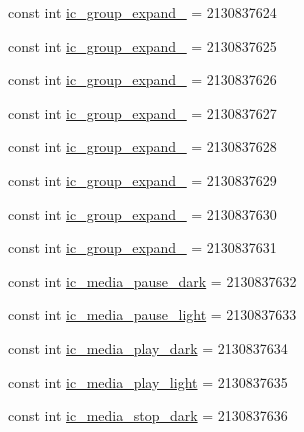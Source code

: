 \begin{DoxyCompactItemize}
const int \mbox{\hyperlink{class_f_w_p_s___app_1_1_droid_1_1_resource_1_1_drawable_aeb0da4a6f39fe37ebdde50a8a6639662}{ic\+\_\+group\+\_\+expand\+\_}} = 2130837624
\item 
const int \mbox{\hyperlink{class_f_w_p_s___app_1_1_droid_1_1_resource_1_1_drawable_a6e53be9af8507125e51d34368090e857}{ic\+\_\+group\+\_\+expand\+\_}} = 2130837625
\item 
const int \mbox{\hyperlink{class_f_w_p_s___app_1_1_droid_1_1_resource_1_1_drawable_a23ce362f15181282a19754dd45e2d028}{ic\+\_\+group\+\_\+expand\+\_}} = 2130837626
\item 
const int \mbox{\hyperlink{class_f_w_p_s___app_1_1_droid_1_1_resource_1_1_drawable_a7671283779e44c6d1b2dbe0d07ea8511}{ic\+\_\+group\+\_\+expand\+\_}} = 2130837627
\item 
const int \mbox{\hyperlink{class_f_w_p_s___app_1_1_droid_1_1_resource_1_1_drawable_a6d97ae100a12e085dc0cb138964bb2c7}{ic\+\_\+group\+\_\+expand\+\_}} = 2130837628
\item 
const int \mbox{\hyperlink{class_f_w_p_s___app_1_1_droid_1_1_resource_1_1_drawable_aab22b26f0e4a20274fdbf6c811189e40}{ic\+\_\+group\+\_\+expand\+\_}} = 2130837629
\item 
const int \mbox{\hyperlink{class_f_w_p_s___app_1_1_droid_1_1_resource_1_1_drawable_a53f7ce1f39a4954c0d303e18876bff49}{ic\+\_\+group\+\_\+expand\+\_}} = 2130837630
\item 
const int \mbox{\hyperlink{class_f_w_p_s___app_1_1_droid_1_1_resource_1_1_drawable_ab1807df8b389a95dbbae597ce92f5c61}{ic\+\_\+group\+\_\+expand\+\_}} = 2130837631
\item 
const int \mbox{\hyperlink{class_f_w_p_s___app_1_1_droid_1_1_resource_1_1_drawable_a85d885f55cab7726da7aaa3507e3c42d}{ic\+\_\+media\+\_\+pause\+\_\+dark}} = 2130837632
\item 
const int \mbox{\hyperlink{class_f_w_p_s___app_1_1_droid_1_1_resource_1_1_drawable_a9f8f30672cb035be62211e6de9842b75}{ic\+\_\+media\+\_\+pause\+\_\+light}} = 2130837633
\item 
const int \mbox{\hyperlink{class_f_w_p_s___app_1_1_droid_1_1_resource_1_1_drawable_a00c77619b5fb3972358bf2df18f051c7}{ic\+\_\+media\+\_\+play\+\_\+dark}} = 2130837634
\item 
const int \mbox{\hyperlink{class_f_w_p_s___app_1_1_droid_1_1_resource_1_1_drawable_a28e04363139c46ded8c1709def76a95a}{ic\+\_\+media\+\_\+play\+\_\+light}} = 2130837635
\item 
const int \mbox{\hyperlink{class_f_w_p_s___app_1_1_droid_1_1_resource_1_1_drawable_ae51492a545d582ad5681dc0173403677}{ic\+\_\+media\+\_\+stop\+\_\+dark}} = 2130837636

\end{DoxyCompactItemize}
